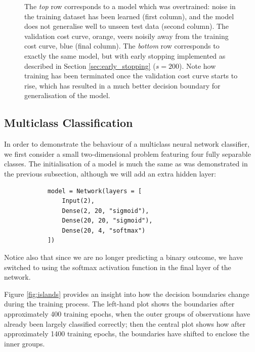 \documentclass{article}[11pt]
\begin{document}
\begin{figure}[h]
            \caption{The \textit{top} row corresponds to a model which was overtrained: noise in the training dataset has been learned (first column), and the model does not generalise well to unseen test data (second column). The validation cost curve, orange, veers noisily away from the training cost curve, blue (final column). The \textit{bottom} row corresponds to exactly the same model, but with early stopping implemented as described in Section \ref{sec:early_stopping} ($s = 200$). Note how training has been terminated once the validation cost curve starts to rise, which has resulted in a much better decision boundary for generalisation of the model.}
            \label{fig:tricky}
        \end{figure}
    
    
    
    \subsection{Multiclass Classification} \label{sec:multiclass_demo}
        
        In order to demonstrate the behaviour of a multiclass neural network classifier, we first consider a small two-dimensional problem featuring four fully separable classes. The initialisation of a model is much the same as was demonstrated in the previous subsection, although we will add an extra hidden layer:
        
        
        \begin{verbatim}
            model = Network(layers = [
                Input(2),
                Dense(2, 20, "sigmoid"),
                Dense(20, 20, "sigmoid"),
                Dense(20, 4, "softmax")
            ])
        \end{verbatim}
        
        Notice also that since we are no longer predicting a binary outcome, we have switched to using the softmax activation function in the final layer of the network.
        
        Figure \ref{fig:islands} provides an insight into how the decision boundaries change during the training process. The left-hand plot shows the boundaries after approximately 400 training epochs, when the outer groups of observations have already been largely classified correctly; then the central plot shows how after approximately 1400 training epochs, the boundaries have shifted to enclose the inner groups.
        
\end{document}

